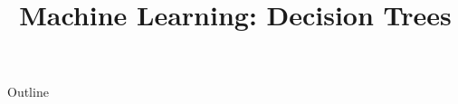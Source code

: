 \documentclass[xcolor=dvipsnames,compress,t,pdf,9pt]{beamer}
\title[\insertframenumber /\inserttotalframenumber]{Machine Learning: Decision Trees}
\begin{document}
	\begin{frame}
	\titlepage
	\end{frame}

	\begin{frame}{Outline}
	    \tableofcontents
	\end{frame}

	
	
	
\end{document}
